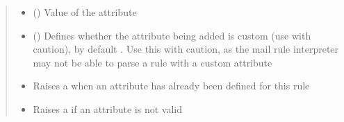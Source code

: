 \documentclass[letterpaper,10pt,english]{sphinxmanual}
\begin{document}
\begin{fulllineitems}
\begin{fulllineitems}
\begin{quote}
\begin{description}
\begin{itemize}
\item {} 
\sphinxAtStartPar
{} () \textendash{} Value of the attribute

\item {} 
\sphinxAtStartPar
{} (\sphinxstyleliteralemphasis{\sphinxupquote{, }}) \textendash{} Defines whether the attribute being added is custom (use with caution), by default .
Use this with caution, as the mail rule interpreter may not be able to parse a rule with
a custom attribute

\end{itemize}

\begin{itemize}
\item {} 
\sphinxAtStartPar
{} \textendash{} Raises a  when an attribute has already been defined for this rule

\item {} 
\sphinxAtStartPar
{} \textendash{} Raises a  if an attribute is not valid

\end{itemize}

\end{description}\end{quote}

\end{fulllineitems}



\end{fulllineitems}
\end{document}
